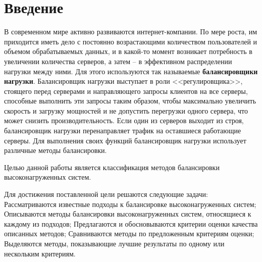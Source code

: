 

\section{Введение}

В современном мире активно развиваются интернет-компании. По мере роста, им
приходится иметь дело с постоянно возрастающими количеством пользователей и
объемом обрабатываемых данных, и в какой-то момент возникает потребность в
увеличении количества серверов, а затем -- в эффективном распределении нагрузки
между ними. Для этого используются так называемые \textbf{балансировщики
нагрузки}. Балансировщик нагрузки выступает в роли <<регулировщика>>, стоящего
перед серверами и направляющего запросы клиентов на все серверы, способные
выполнить эти запросы таким образом, чтобы максимально увеличить скорость и
загрузку мощностей и не допустить перегрузки одного сервера, что может снизить
производительность. Если один из серверов выходит из строя, балансировщик
нагрузки перенаправляет трафик на оставшиеся работающие серверы. Для выполнения
своих функций балансировщик нагрузки использует различные методы балансировки.
\cite{nginxlb}


Целью данной работы является классификация методов балансировки
высоконагруженных систем.


Для достижения поставленной цели решаются следующие задачи:
    Рассматриваются известные подходы к балансировке высоконагруженных систем;
    Описываются методы балансировки высоконагруженных систем, относящиеся к каждому из подходов;
    Предлагаются и обосновываются критерии оценки качества описанных методов;
    Сравниваются методы по предложенным критериям оценки;
    Выделяются методы, показывающие лучшие результаты по одному или нескольким критериям.

